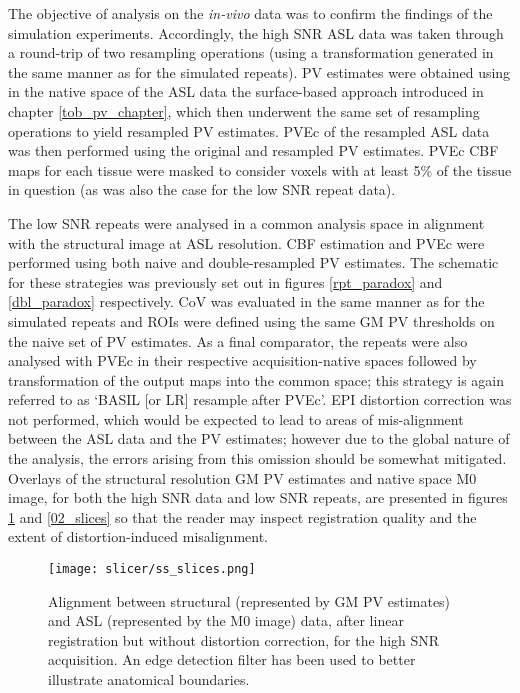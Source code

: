 The objective of analysis on the \textit{in-vivo} data was to confirm the findings of the simulation experiments. Accordingly, the high SNR ASL data was taken through a round-trip of two resampling operations (using a transformation generated in the same manner as for the simulated repeats). PV estimates were obtained using in the native space of the ASL data the surface-based approach introduced in chapter \ref{tob_pv_chapter}, which then underwent the same set of resampling operations to yield resampled PV estimates. PVEc of the resampled ASL data was then performed using the original and resampled PV estimates. PVEc CBF maps for each tissue were masked to consider voxels with at least 5\% of the tissue in question (as was also the case for the low SNR repeat data). 

The low SNR repeats were analysed in a common analysis space in alignment with the structural image at ASL resolution. CBF estimation and PVEc were performed using both naive and double-resampled PV estimates. The schematic for these strategies was previously set out in figures \ref{rpt_paradox} and \ref{dbl_paradox} respectively. CoV was evaluated in the same manner as for the simulated repeats and ROIs were defined using the same GM PV thresholds on the naive set of PV estimates. As a final comparator, the repeats were also analysed with PVEc in their respective acquisition-native spaces followed by transformation of the output maps into the common space; this strategy is again referred to as `BASIL [or LR] resample after PVEc'. EPI distortion correction was not performed, which would be expected to lead to areas of mis-alignment between the ASL data and the PV estimates; however due to the global nature of the analysis, the errors arising from this omission should be somewhat mitigated. Overlays of the structural resolution GM PV estimates and native space M0 image, for both the high SNR data and low SNR repeats, are presented in figures \ref{ss_slices} and \ref{02_slices} so that the reader may inspect registration quality and the extent of distortion-induced misalignment. 

\begin{figure}[H]
\centering
\texttt{[image: slicer/ss\_slices.png]}
\caption{Alignment between structural (represented by GM PV estimates) and ASL (represented by the M0 image) data, after linear registration but without distortion correction, for the high SNR acquisition. An edge detection filter has been used to better illustrate anatomical boundaries.}
\label{ss_slices}
\end{figure}


